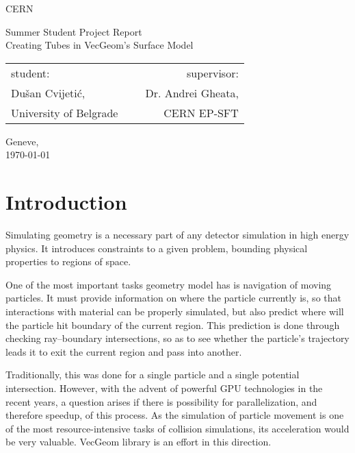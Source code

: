 \documentclass[12pt, a4paper]{article}
\begin{document}
	
\thispagestyle{empty}
{ \centering
	CERN
	\vspace*{0.5cm}
	
	\footnotesize
	Summer Student Project Report\\
	\huge
	{\sc Creating Tubes in VecGeom's Surface Model}\\
	\vspace{0.4cm}
	\footnotesize
	\begin{tabular}{l c r}
		student: & \hspace{3cm}\ & supervisor:\\
		Dušan Cvijetić\footnotemark, && Dr. Andrei Gheata, \\
		\scriptsize University of Belgrade && \scriptsize CERN EP-SFT
	\end{tabular}
	
	\normalsize
	\vspace{0.5cm}
	Geneve,\\
	\today
		
	
}

\vfill
\begin{abstract}
	\blindtext
\end{abstract}
\vfill

\newpage


\tableofcontents

\section{Introduction}

Simulating geometry is a necessary part of any detector simulation in high energy physics. It introduces constraints to a given problem, bounding physical properties to regions of space.

One of the most important tasks geometry model has is navigation of moving particles. It must provide information on where the particle currently is, so that interactions with material can be properly simulated, but also predict where will the particle hit boundary of the current region. This prediction is done through checking ray--boundary intersections, so as to see whether the particle's trajectory leads it to exit the current region and pass into another.

Traditionally, this was done for a single particle and a single potential intersection. However, with the advent of powerful GPU technologies in the recent years, a question arises if there is possibility for parallelization, and therefore speedup, of this process. As the simulation of particle movement is one of the most resource-intensive tasks of collision simulations, its acceleration would be very valuable. VecGeom library is an effort in this direction.
\end{document}
